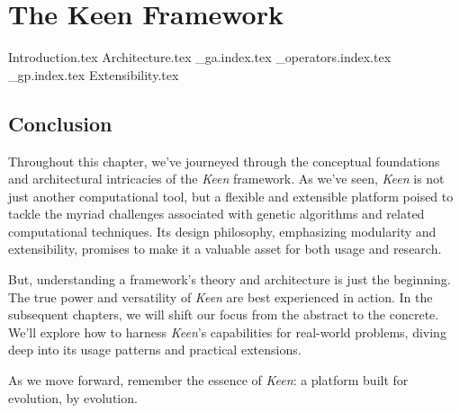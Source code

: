 
\chapter{The Keen Framework}
\label{chap:keen}
  {Introduction.tex}
  {Architecture.tex}
  {_ga.index.tex}
  {_operators.index.tex}
  {_gp.index.tex}
  {Extensibility.tex}

  \section{Conclusion}
  \label{sec:keen:conclusion}
    Throughout this chapter, we've journeyed through the conceptual foundations 
    and architectural intricacies of the \textit{Keen} framework. As we've seen, 
    \textit{Keen} is not just another computational tool, but a flexible and 
    extensible platform poised to tackle the myriad challenges associated with 
    genetic algorithms and related computational techniques. Its design 
    philosophy, emphasizing modularity and extensibility, promises to make it a 
    valuable asset for both usage and research.

    But, understanding a framework's theory and architecture is just the 
    beginning. The true power and versatility of \textit{Keen} are best 
    experienced in action. In the subsequent chapters, we will shift our focus 
    from the abstract to the concrete. We'll explore how to harness 
    \textit{Keen}'s capabilities for real-world problems, diving deep into its 
    usage patterns and practical extensions.

    As we move forward, remember the essence of \textit{Keen}: a platform built 
    for evolution, by evolution.